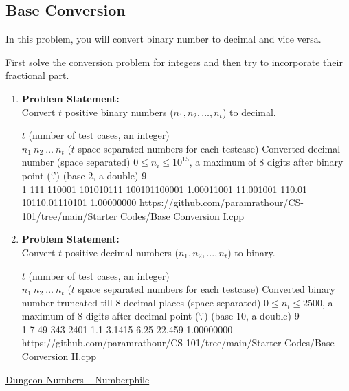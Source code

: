 \documentclass[../../Problems]{subfiles}
\begin{document}
\subsection{Base Conversion}{\label{pp:baseconversion}}
In this problem, you will convert binary number to decimal and vice versa.
\begin{hint}
First solve the conversion problem for integers and then try to incorporate their fractional part.
\end{hint}
\begin{enumerate}[label=(\alph*)]
\item 
\textbf{Problem Statement:}\\
Convert $t$ positive binary numbers ($n_1,n_2,\ldots,n_t$) to decimal.
\begin{testcases}
	{$t$ \hfill(number of test cases, an integer)\\
	$n_1\ n_2\ \ldots\ n_t$ \hfill($t$ space separated numbers for each testcase)}
	{Converted decimal number \hfill(space separated)}
	{$0\leq n_i\leq 10^{15}$, a maximum of $8$ digits after binary point (`.') \hfill(base $2$, a double)}
	{9\\1 111 110001 101010111 100101100001 1.00011001 11.001001 110.01 10110.01110101}
	{1.00000000}
	{https://github.com/paramrathour/CS-101/tree/main/Starter Codes/Base Conversion I.cpp}
\end{testcases}
\item 
\textbf{Problem Statement:}\\
Convert $t$ positive decimal numbers ($n_1,n_2,\ldots,n_t$) to binary.
\begin{testcases}
	{$t$ \hfill(number of test cases, an integer)\\
	$n_1\ n_2\ \ldots\ n_t$ \hfill($t$ space separated numbers for each testcase)}
	{Converted binary number truncated till $8$ decimal places \hfill(space separated)}
	{$0\leq n_i\leq 2500$, a maximum of $8$ digits after decimal point (`.') \hfill(base $10$, a double)}
	{9\\1 7 49 343 2401 1.1 3.1415 6.25 22.459}
	{1.00000000}
	{https://github.com/paramrathour/CS-101/tree/main/Starter Codes/Base Conversion II.cpp}
\end{testcases}
\end{enumerate}
\begin{funvideo}
\href{https://youtu.be/xNx3JxRhnZE}{Dungeon Numbers -- Numberphile}
\end{funvideo}
\end{document}

